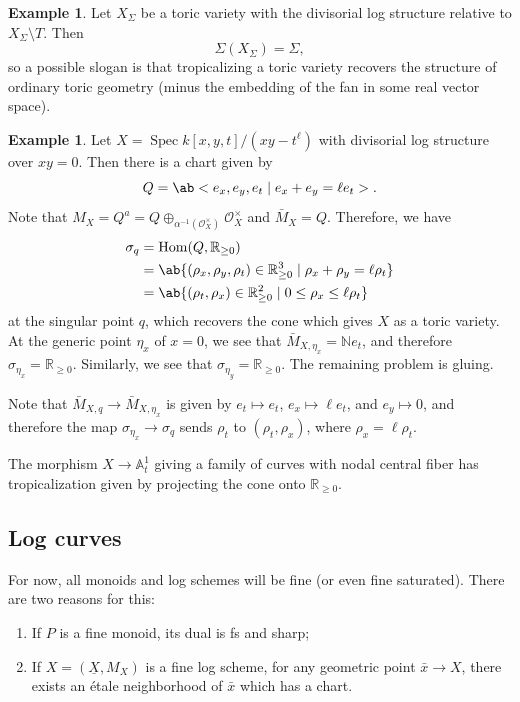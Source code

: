\documentclass{amsart}
\theoremstyle{definition}
\newtheorem{exm}[thm]{Example}
\theoremstyle{remark}
\theoremstyle{plain}
\theoremstyle{definition}
\theoremstyle{remark}
\newcommand{\A}{\mathbb{A}}
\newcommand{\N}{\mathbb{N}}
\newcommand{\R}{\mathbb{R}}
\newcommand{\mc}[1]{\mathcal{#1}}
\newcommand{\ul}[1]{\underline{#1}}
\newcommand{\1}{\mathbf{1}}
\newcommand{\2}{\mathbf{2}}
\newcommand{\3}{\mathbf{3}}
\DeclareMathOperator{\Hom}{Hom}
\DeclareMathOperator{\Spec}{Spec}
\begin{document}
\begin{exm}
    Let \(X_{\Sigma}\) be a toric variety with the divisorial log structure relative to \(X_{\Sigma} \setminus T\). Then
    \[ \Sigma(X_{\Sigma}) = \Sigma, \]
    so a possible slogan is that tropicalizing a toric variety recovers the structure of ordinary toric geometry (minus the embedding of the fan in some real vector space).
\end{exm}

\begin{exm}
    Let \(X = \Spec k[x,y,t]/(xy-t^{\ell})\) with divisorial log structure over \(xy = 0\). Then there is a chart given by
    \[ Q = \ab<e_x, e_y, e_t \mid e_x + e_y = \ell e_t>. \]
    Note that \(M_X = Q^a = Q \oplus_{\alpha^{-1}(\mc{O}_X^{\times})} \mc{O}_X^{\times}\) and \(\bar{M}_X = Q\). Therefore, we have
    \begin{align*}
        \sigma_q &= \Hom(Q, \R_{\geq 0}) \\
        &= \ab\{ (\rho_x, \rho_y, \rho_t) \in \R_{\geq 0}^3 \mid \rho_x + \rho_y = \ell \rho_t \} \\
        &= \ab\{ (\rho_t, \rho_x) \in \R_{\geq 0}^2 \mid 0 \leq \rho_x \leq \ell \rho_t \}
    \end{align*}
    at the singular point \(q\), which recovers the cone which gives \(X\) as a toric variety. At the generic point \(\eta_x\) of \(x = 0\), we see that \(\bar{M}_{X, \eta_x} = \N e_t\), and therefore \(\sigma_{\eta_x} = \R_{\geq 0}\). Similarly, we see that \(\sigma_{\eta_y} = \R_{\geq 0}\). The remaining problem is gluing. 

    Note that \(\bar{M}_{X, q} \to \bar{M}_{X, \eta_x}\) is given by \(e_t \mapsto e_t\), \(e_x \mapsto \ell e_t\), and \(e_y \mapsto 0\), and therefore the map \(\sigma_{\eta_x} \to \sigma_q\) sends \(\rho_t\) to \((\rho_t, \rho_x)\), where \(\rho_x = \ell \rho_t\).

    The morphism \(X \to \A^1_t\) giving a family of curves with nodal central fiber has tropicalization given by projecting the cone onto \(\R_{\geq 0}\).
\end{exm}


\subsection{Log curves}%
\label{sub:Log curves}

For now, all monoids and log schemes will be fine (or even fine saturated). There are two reasons for this:
\begin{enumerate}
    \item If \(P\) is a fine monoid, its dual is fs and sharp;
    \item If \(X = (\ul{X}, M_X)\) is a fine log scheme, for any geometric point \(\bar{x} \to X\), there exists an \'etale neighborhood of \(\bar{x}\) which has a chart.
\end{enumerate}
\end{document}
